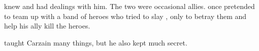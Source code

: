  knew \ZeethanKraal and had dealings with him. 
The two were occasional allies.
\Shachar once pretended to team up with a band of heroes who tried to slay \Kraal, only to betray them and help his ally \Kraal kill the heroes.

\Kraal taught Carzain many things, but he also kept much secret. 






























